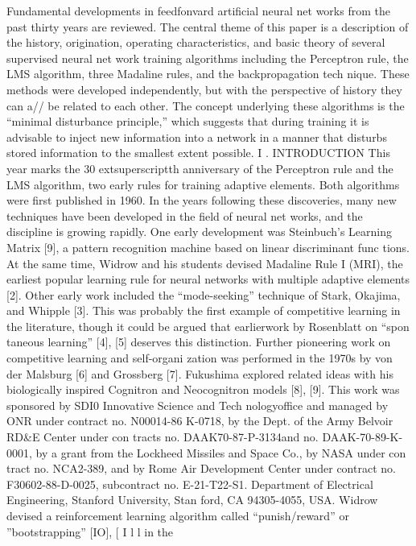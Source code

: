 \documentclass[11pt,a4paper,twocolumn]{article}
\begin{document}
Fundamental developments in feedfonvard artificial neural net
works from the past thirty years are reviewed. The central theme of 
this paper is a description of the history, origination, operating 
characteristics, and basic theory of several supervised neural net
work training algorithms including the Perceptron rule, the LMS 
algorithm, three Madaline rules, and the backpropagation tech
nique. These methods were developed independently, but with 
the perspective of history they can a// be related to each other. The 
concept underlying these algorithms is the “minimal disturbance 
principle,” which suggests that during training it is advisable to 
inject new information into a network in a manner that disturbs 
stored information to the smallest extent possible. 
I .  INTRODUCTION 
This year marks the 30	extsuperscript{th} anniversary of the Perceptron 
rule and the LMS algorithm, two early rules for training 
adaptive elements. Both algorithms were first published in 
1960. In the years following these discoveries, many new 
techniques have been developed in the field of neural net
works, and the discipline is growing rapidly. One early 
development was Steinbuch’s Learning Matrix [9], a pattern 
recognition machine based on linear discriminant func
tions. At the same time, Widrow and his students devised 
Madaline Rule I (MRI), the earliest popular learning rule for 
neural networks with multiple adaptive elements [2]. Other 
early work included the “mode-seeking” technique of 
Stark, Okajima, and Whipple [3]. This was probably the first 
example of competitive learning in the literature, though 
it could be argued that earlierwork by Rosenblatt on “spon
taneous learning” [4], [5] deserves this distinction. Further 
pioneering work on competitive learning and self-organi
zation was performed in the 1970s by von der Malsburg [6] 
and Grossberg [7]. Fukushima explored related ideas with 
his biologically inspired Cognitron and Neocognitron 
models [8], [9]. 
This work was sponsored by SDI0 Innovative Science and Tech
nologyoffice and managed by ONR under contract no. N00014-86
K-0718, by the Dept. of the Army Belvoir RD\&E Center under con
tracts no. DAAK70-87-P-3134and no. DAAK-70-89-K-0001, by a grant 
from the Lockheed Missiles and Space Co., by NASA under con
tract no. NCA2-389, and by Rome Air Development Center under 
contract no. F30602-88-D-0025, subcontract no. E-21-T22-S1. 
Department of Electrical Engineering, Stanford University, Stan
ford, CA 94305-4055, USA. 
Widrow devised a reinforcement learning algorithm 
called “punish/reward” or ”bootstrapping” [IO], [ I l l  in the 
\end{document}
